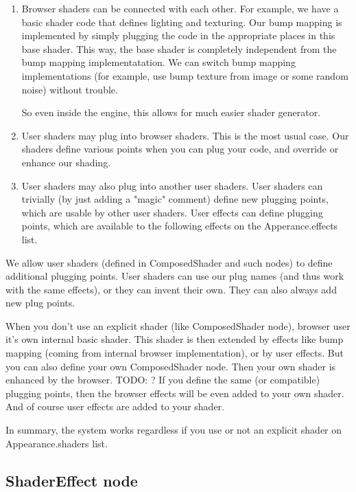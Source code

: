 \documentclass{acmsiggraph}                     %
\newenvironment{myenumerate}
{\begin{enumerate}
  \setlength{\itemsep}{0pt}
  \setlength{\parskip}{0pt}
  \setlength{\parsep}{0pt}}
{\end{enumerate}}
\begin{document}
\begin{myenumerate}
\itemsep 0pt
\item Browser shaders can be connected with each other. For example, we
have a basic shader code that defines lighting and texturing. Our bump
mapping is implemented by simply plugging the code in the appropriate
places in this base shader. This way, the base shader is completely
independent from the bump mapping implementatation. We can switch bump
mapping implementations (for example, use bump texture from image or
some random noise) without trouble.

So even inside the engine, this allows for much easier shader generator.

\item User shaders may plug into browser shaders. This is the most usual
case. Our shaders define various points when you can plug your code,
and override or enhance our shading.

\item User shaders may also plug into another user shaders. User shaders
can trivially (by just adding a "magic" comment) define new plugging
points, which are usable by other user shaders. User effects can
define plugging points, which are available to the following effects
on the Apperance.effects list.

\end{myenumerate}

We allow user shaders (defined in ComposedShader and such nodes) to
define additional plugging points. User shaders can use our plug names
(and thus work with the same effects), or they can invent their
own. They can also always add new plug points.

When you don't use an explicit shader (like ComposedShader node),
browser user it's own internal basic shader. This shader is then
extended by effects like bump mapping (coming from internal browser
implementation), or by user effects. But you can also define your own
ComposedShader node. Then your own shader is enhanced by the
browser. TODO: ? If you define the same (or compatible) plugging
points, then the browser effects will be even added to your own
shader. And of course user effects are added to your shader.

In summary, the system works regardless if you use or not an explicit
shader on Appearance.shaders list.

\subsection{ShaderEffect node}
\end{document}

